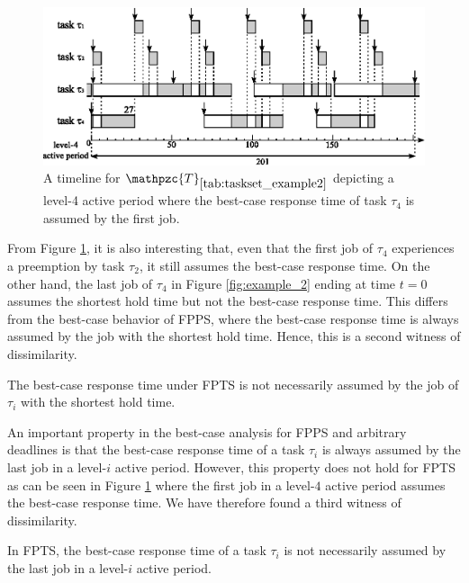 \begin{figure}[h]
	\centering
	\includegraphics[width=.84\linewidth]{figures/example_3}
	\caption{A timeline for $\mathpzc{T}_{\ref{tab:taskset_example2}}$ depicting a level-4 active period where the best-case response time of task $\tau_4$ is assumed by the first job.}
	\label{fig:example_3}
\end{figure}

From Figure \ref{fig:example_3}, it is also interesting that, even that the first job of $\tau_4$ experiences a preemption by task $\tau_2$, it still assumes the best-case response time. On the other hand, the last job of $\tau_4$ in Figure \ref{fig:example_2} ending at time $t=0$ assumes the shortest hold time but not the best-case response time. This differs from the best-case behavior of FPPS, where the best-case response time is always assumed by the job with the shortest hold time. Hence, this is a second witness of dissimilarity.

\begin{fact} \label{cor:shortest_hold_time}The best-case response time under FPTS is not necessarily assumed by the job of $\tau_i$ with the shortest hold time.
\end{fact}



An important property in the best-case analysis for FPPS and arbitrary deadlines is that the best-case response time of a task $\tau_i$ is always assumed by the last job in a level-$i$ active period. However, this property does not hold for FPTS as can be seen in Figure \ref{fig:example_3} where the first job in a level-$4$ active period assumes the best-case response time. We have therefore found a third witness of dissimilarity.

\begin{fact}\label{fct:active_period}
	In FPTS, the best-case response time of a task $\tau_i$ is not necessarily assumed by the last job in a level-$i$ active period.
\end{fact}
\fi

